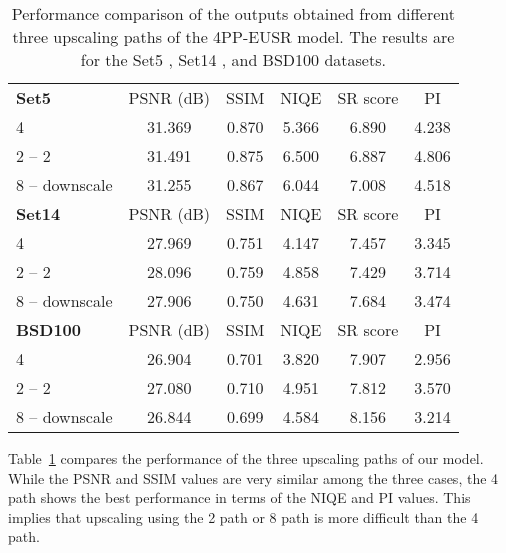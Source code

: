 \documentclass[runningheads]{llncs}
\begin{document}
\begin{table}[t]
	\setlength{\tabcolsep}{0.4em}
	\scriptsize
	\centering
	\caption{Performance comparison of the outputs obtained from different three upscaling paths of the 4PP-EUSR model. The results are for the Set5 \cite{bevilacqua2012low}, Set14 \cite{zeyde2010single}, and BSD100 \cite{martin2001database} datasets.}
	\label{table:result_upscale_path_comparison}
	\begin{tabular}{lccccc}
		\textbf{Set5} & PSNR (dB) & SSIM & NIQE & SR score & PI \\
		\noalign{\smallskip}
		\hline
		\noalign{\smallskip}
		4 & 31.369 & 0.870 & 5.366 & 6.890 & 4.238 \\
		2 -- 2 & 31.491 & 0.875 & 6.500 & 6.887 & 4.806 \\
		8 -- downscale & 31.255 & 0.867 & 6.044 & 7.008 & 4.518 \\
		\noalign{\smallskip}
		\noalign{\smallskip}
		\textbf{Set14} & PSNR (dB) & SSIM & NIQE & SR score & PI \\
		\noalign{\smallskip}
		\hline
		\noalign{\smallskip}
		4 & 27.969 & 0.751 & 4.147 & 7.457 & 3.345 \\
		2 -- 2 & 28.096 & 0.759 & 4.858 & 7.429 & 3.714 \\
		8 -- downscale & 27.906 & 0.750 & 4.631 & 7.684 & 3.474 \\
		\noalign{\smallskip}
		\noalign{\smallskip}
		\textbf{BSD100} & PSNR (dB) & SSIM & NIQE & SR score & PI \\
		\noalign{\smallskip}
		\hline
		\noalign{\smallskip}
		4 & 26.904 & 0.701 & 3.820 & 7.907 & 2.956 \\
		2 -- 2 & 27.080 & 0.710 & 4.951 & 7.812 & 3.570 \\
		8 -- downscale & 26.844 & 0.699 & 4.584 & 8.156 & 3.214
	\end{tabular}
\end{table}


Table~\ref{table:result_upscale_path_comparison} compares the performance of the three upscaling paths of our model.
While the PSNR and SSIM values are very similar among the three cases, the 4 path shows the best performance in terms of the NIQE and PI values.
This implies that upscaling using the 2 path or 8 path is more difficult than the 4 path.
\end{document}
